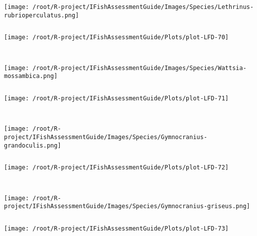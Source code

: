 \documentclass{report}\usepackage[]{graphicx}\usepackage[]{color}
\makeatletter
\def\maxwidth{ %
  \ifdim\Gin@nat@width>\linewidth
    \linewidth
  \else
    \Gin@nat@width
  \fi
}
\newenvironment{kframe}{%
 \def\at@end@of@kframe{}%
 \ifinner\ifhmode%
  \def\at@end@of@kframe{\end{minipage}}%
  \begin{minipage}{\columnwidth}%
 \fi\fi%
 \def\FrameCommand##1{\hskip\@totalleftmargin \hskip-\fboxsep
 \colorbox{shadecolor}{##1}\hskip-\fboxsep
     \hskip-\linewidth \hskip-\@totalleftmargin \hskip\columnwidth}%
 \MakeFramed {\advance\hsize-\width
   \@totalleftmargin\z@ \linewidth\hsize
   \@setminipage}}%
 {\par\unskip\endMakeFramed%
 \at@end@of@kframe}
\newenvironment{knitrout}{}{} %
\makeatother
\begin{document}
\begin{knitrout}
\begin{kframe}
\begin{verbatim}
\end{verbatim}
\end{kframe}
\texttt{[image: /root/R-project/IFishAssessmentGuide/Images/Species/Lethrinus-rubrioperculatus.png]}
\begin{kframe}\begin{verbatim}
\end{verbatim}
\end{kframe}
\texttt{[image: /root/R-project/IFishAssessmentGuide/Plots/plot-LFD-70]} 
\begin{kframe}\begin{verbatim}
 
\end{verbatim}
\end{kframe}
\texttt{[image: /root/R-project/IFishAssessmentGuide/Images/Species/Wattsia-mossambica.png]}
\begin{kframe}\begin{verbatim}
\end{verbatim}
\end{kframe}
\texttt{[image: /root/R-project/IFishAssessmentGuide/Plots/plot-LFD-71]} 
\begin{kframe}\begin{verbatim}
 
\end{verbatim}
\end{kframe}
\texttt{[image: /root/R-project/IFishAssessmentGuide/Images/Species/Gymnocranius-grandoculis.png]}
\begin{kframe}\begin{verbatim}
\end{verbatim}
\end{kframe}
\texttt{[image: /root/R-project/IFishAssessmentGuide/Plots/plot-LFD-72]} 
\begin{kframe}\begin{verbatim}
 
\end{verbatim}
\end{kframe}
\texttt{[image: /root/R-project/IFishAssessmentGuide/Images/Species/Gymnocranius-griseus.png]}
\begin{kframe}\begin{verbatim}
\end{verbatim}
\end{kframe}
\texttt{[image: /root/R-project/IFishAssessmentGuide/Plots/plot-LFD-73]} 
\begin{kframe}\begin{verbatim}
 

\end{verbatim}
\end{kframe}
\end{knitrout}
\end{document}
